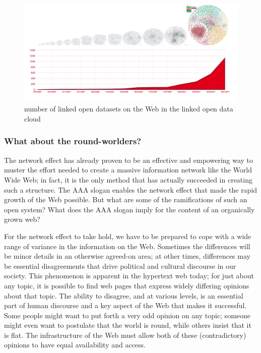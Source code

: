\begin{figure}
    \centering
    \includegraphics[width=5.0in]{media/image1.png}
    \caption{number of linked open datasets on the Web in the linked open
data cloud}
    \label{fig:ch1.1}
\end{figure}


\subsubsection{What about the round-worlders?}

The network effect has already proven to be an effective and empowering
way to muster the effort needed to create a massive information network
like the World Wide Web; in fact, it is the only method that has
actually succeeded in creating such a structure. The AAA slogan enables
the network effect that made the rapid growth of the Web possible. But
what are some of the ramifications of such an open system? What does the
AAA slogan imply for the content of an organically grown web?

For the network effect to take hold, we have to be prepared to cope with
a wide range of variance in the information on the Web. Sometimes the
differences will be minor details in an otherwise agreed-on area; at
other times, differences may be essential disagreements that drive
political and cultural discourse in our society. This phenomenon is
apparent in the hypertext web today; for just about any topic, it is
possible to find web pages that express widely differing opinions about
that topic. The ability to disagree, and at various levels, is an
essential part of human discourse and a key aspect of the Web that makes
it successful. Some people might want to put forth a very odd opinion on
any topic; someone might even want to postulate that the world is round,
while others insist that it is flat. The infrastructure of the Web must
allow both of these (contradictory) opinions to have equal availability
and access.

